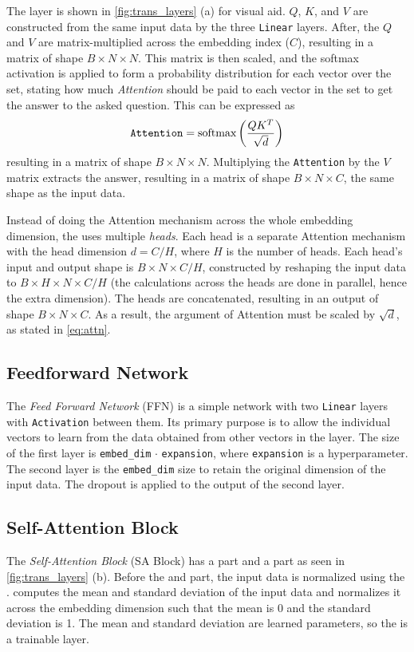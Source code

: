 The \MHSA layer is shown in \cref{fig:trans_layers} (a) for visual aid. 
$Q$, $K$, and $V$ are constructed from the same input data by the three \texttt{Linear} layers.
After, the $Q$ and $V$ are matrix-multiplied across the embedding index ($C$), resulting in a matrix of shape $B \times N \times N$.
This matrix is then scaled, and the softmax activation is applied to form a probability distribution for each vector over the set, stating how much \emph{Attention} should be paid to each vector in the set to get the answer to the asked question.
This can be expressed as 
\begin{equation}
    \label{eq:attn}
    \text{\texttt{Attention}} = \text{softmax}\left(\frac{QK^T}{\sqrt{d}}\right)
\end{equation}
resulting in a matrix of shape $B \times N \times N$.
Multiplying the \texttt{Attention} by the $V$ matrix extracts the answer, resulting in a  matrix of shape $B \times N \times C$, the same shape as the input data.

Instead of doing the Attention mechanism across the whole embedding dimension, the \trans uses multiple \emph{heads}.
Each head is a separate Attention mechanism with the head dimension $d = C / H$, where $H$ is the number of heads. 
Each head's input and output shape is $B \times N \times C/H$, constructed by reshaping the input data to $B \times H \times N \times C/H$ (the calculations across the heads are done in parallel, hence the extra dimension).
The heads are concatenated, resulting in an output of shape $B \times N \times C$.
As a result, the argument of Attention must be scaled by $\sqrt{d}$, as stated in \cref{eq:attn}.

\subsection{Feedforward Network}
\label{sec:ffn}
The \emph{Feed Forward Network} (FFN) is a simple network with two \texttt{Linear} layers with \texttt{Activation} between them.
Its primary purpose is to allow the individual vectors to learn from the data obtained from other vectors in the \MHSA layer. 
The size of the first layer is \texttt{embed\_dim} $\cdot$ \texttt{expansion}, where \texttt{expansion} is a hyperparameter.
The second layer is the \texttt{embed\_dim} size to retain the original dimension of the input data.
The dropout is applied to the output of the second layer.


\subsection{Self-Attention Block}
\label{sec:SA_block}
The \emph{Self-Attention Block} (SA Block) has a \MHSA part and a \FFN part as seen in \cref{fig:trans_layers} (b).
Before the \MHSA and \FFN part, the input data is normalized using the \LN. 
\LN computes the mean and standard deviation of the input data and normalizes it across the embedding dimension such that the mean is 0 and the standard deviation is 1.
The mean and standard deviation are learned parameters, so the \LN is a trainable layer.

